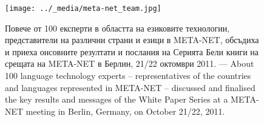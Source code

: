 \documentclass[]{../../metanetpaper}
\begin{document}
\begin{figure}[htb]
  \center
  \texttt{[image: ../\_media/meta-net\_team.jpg]}
  \caption{Повече от 100 експерти в областта на езиковите технологии, представители на различни страни и езици в META-NET, обсъдиха и приеха онсовните резултати и послания на Серията Бели книги на срещата на  META-NET в Берлин, 21/22 октомври 2011. --- \textcolor{grey1}{About 100 language technology experts -- representatives of the countries and languages represented in META-NET -- discussed and finalised the key results and messages of the White Paper Series at a META-NET meeting in Berlin, Germany, on October 21/22, 2011.}}
  \medskip
\end{figure}

\cleardoublepage

\label{whitepaperseries}
\end{document}
